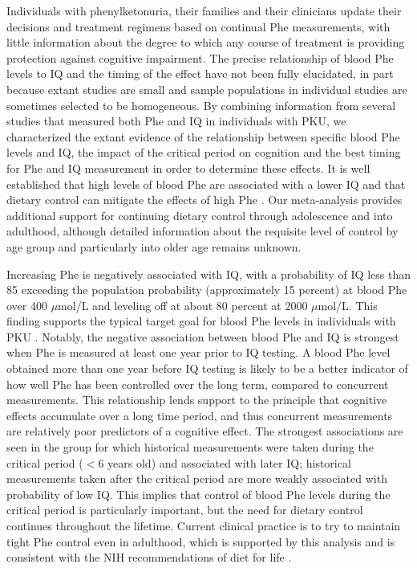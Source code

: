 \documentclass{svjour3}                     %
\begin{document}
Individuals with phenylketonuria, their families and their clinicians update their decisions and treatment regimens based on continual Phe measurements, with little information about the degree to which any course of treatment is providing protection against cognitive impairment. The precise relationship of blood Phe levels to IQ and the timing of the effect have not been fully elucidated, in part because extant studies are small and sample populations in individual studies are sometimes selected to be homogeneous. By combining information from several studies that measured both Phe and IQ in individuals with PKU, we characterized the extant evidence of the relationship between specific blood Phe levels and IQ, the impact of the critical period on cognition and the best timing for Phe and IQ measurement in order to determine these effects. It is well established that high levels of blood Phe are associated with a lower IQ \citep{Waisbren:2007es} and that dietary control can mitigate the effects of high Phe \citep{Weglage:1993wh, Channon:2007ca, Vilaseca:2010tq}. Our meta-analysis provides additional support for continuing dietary control through adolescence and into adulthood, although detailed information about the requisite level of control by age group and particularly into older age remains unknown.

Increasing Phe is negatively associated with IQ, with a probability of IQ less than 85 exceeding the population probability (approximately 15 percent) at blood Phe over 400 $\mu$mol/L and leveling off at about 80 percent at 2000 $\mu$mol/L. This finding supports the typical target goal for blood Phe levels in individuals with PKU \cite[under 360 $\mu$mol/L,][]{NationalInstitutesofHealthConsensusDevelopmentPanel:2001ti}. Notably, the negative association between blood Phe and IQ is strongest when Phe is measured at least one year prior to IQ testing. A blood Phe level obtained more than one year before IQ testing is likely to be a better indicator of how well Phe has been controlled over the long term, compared to concurrent measurements. This relationship lends support to the principle that cognitive effects accumulate over a long time period, and thus concurrent measurements are relatively poor predictors of a cognitive effect. The strongest associations are seen in the group for which historical measurements were taken during the critical period ($<6$ years old) and associated with later IQ; historical measurements taken after the critical period are more weakly associated with probability of low IQ. This implies that control of blood Phe levels during the critical period is particularly important, but the need for dietary control continues throughout the lifetime. Current clinical practice is to try to maintain tight Phe control even in adulthood, which is supported by this analysis and is consistent with the NIH recommendations of diet for life \citep{Koch:2002ul}.
\end{document}

